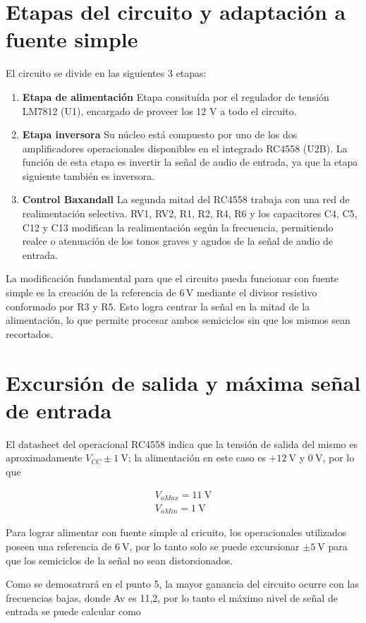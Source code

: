 \documentclass{article}
\begin{document}
\section{Etapas del circuito y adaptación a fuente simple}

El circuito se divide en las siguientes 3 etapas:

\begin{enumerate}
    \item \textbf{Etapa de alimentación} Etapa consituída por el regulador de tensión
        LM7812 (U1), encargado de proveer los 12 V a todo el circuito.

    \item \textbf{Etapa inversora} Su núcleo está compuesto por uno de los dos
        amplificadores operacionales disponibles en el integrado RC4558 (U2B). La función de
        esta etapa es invertir la señal de audio de entrada, ya que la etapa siguiente
        también es inversora.

    \item \textbf{Control Baxandall} La segunda mitad del RC4558 trabaja con una red
    de realimentación selectiva. RV1, RV2, R1, R2, R4, R6 y los capacitores C4, C5, C12 y C13
    modifican la realimentación según la frecuencia, permitiendo realce o atenuación de
    los tonos graves y agudos de la señal de audio de entrada.
\end{enumerate}

La modificación fundamental para que el circuito pueda funcionar con fuente simple es la
creación de la referencia de \(6\,\mathrm{V}\) mediante el divisor resistivo conformado
por R3 y R5. Esto logra centrar la señal en la mitad de la alimentación, lo que  permite
procesar ambos semiciclos sin que los mismos sean recortados.

\section{Excursión de salida y máxima señal de entrada}
El datasheet del operacional RC4558 indica que la tensión de salida del mismo
es aproximadamente $V_{CC} \pm \SI{1}{\volt}$; la alimentación en este caso es
$+\SI{12}{\volt}$ y $\SI{0}{\volt}$, por lo que

\[
\begin{gathered}
    V_{oMax} = \SI{11}{\volt} \\
    V_{oMin} = \SI{1}{\volt}
\end{gathered}
\]

Para lograr alimentar con fuente simple al cricuito, los operacionales
utilizados poseen una referencia de $\SI{6}{\volt}$, por lo tanto solo se puede
excursionar $\pm \SI{5}{\volt}$ para que los semiciclos de la señal no sean
distorsionados.\par
Como se demosatrará en el punto 5, la mayor ganancia del circuito ocurre con
las frecuencias bajas, donde Av es 11,2, por lo tanto el
máximo nivel de señal de entrada se puede calcular como
\end{document}
